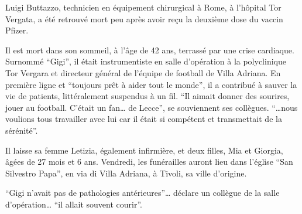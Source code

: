 Luigi Buttazzo, technicien en équipement chirurgical à Rome, à l'hôpital Tor
Vergata, a été retrouvé mort peu après avoir reçu la deuxième dose du vaccin
Pfizer.

Il est mort dans son sommeil, à l'âge de 42 ans, terrassé par une crise
cardiaque. Surnommé “Gigi”, il était instrumentiste en salle d'opération à la
polyclinique Tor Vergara et directeur général de l'équipe de football de Villa
Adriana. En première ligne et “toujours prêt à aider tout le monde”, il a
contribué à sauver la vie de patients, littéralement suspendus à un fil. “Il
aimait donner des sourires, jouer au football. C'était un fan… de Lecce”, se
souviennent ses collègues. “…nous voulions tous travailler avec lui car il était
si compétent et transmettait de la sérénité”.

Il laisse sa femme Letizia, également infirmière, et deux filles, Mia et
Giorgia, âgées de 27 mois et 6 ans. Vendredi, les funérailles auront lieu dans
l'église “San Silvestro Papa”, en via di Villa Adriana, à Tivoli, sa ville
d'origine.

“Gigi n'avait pas de pathologies antérieures”… déclare un collègue de la salle
d'opération… “il allait souvent courir”.


